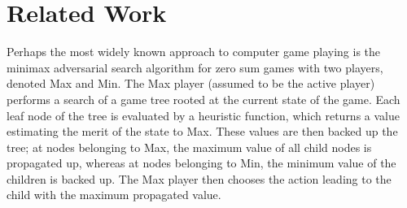 \documentclass[letterpaper]{article}
\numberwithin{equation}{section}
\numberwithin{theorem}{section}
\numberwithin{lemma}{section}
\numberwithin{df}{section}
\begin{document}
%

\section{Related Work}

Perhaps the most widely known approach to computer game playing is the minimax adversarial search algorithm for zero sum games with two players, denoted Max and Min.  The Max player (assumed to be the active player) performs a search of a game tree rooted at the current state of the game.  Each leaf node of the tree is evaluated by a heuristic function, which returns a value estimating the merit of the state to Max.  These values are then backed up the tree; at nodes belonging to Max, the maximum value of all child nodes is propagated up, whereas at nodes belonging to Min, the minimum value of the children is backed up.  The Max player then chooses the action leading to the child with the maximum propagated value.

\end{document}
